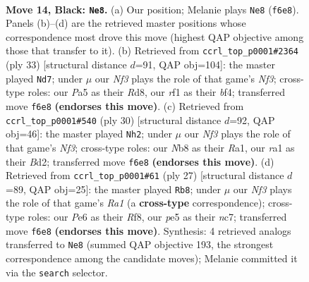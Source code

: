 \documentclass[11pt]{article}
\begin{document}
\clearpage

\begin{figure}[p]\centering
\begin{subfigure}{0.46\textwidth}\centering
\resizebox{\linewidth}{!}{%
\newchessgame
\chessboard[
  setfen={rnb2rk1/1p2bppp/1q2pn2/p3P3/P1PN1P1P/6P1/6B1/RNBQ1RK1 b - - 0 14},
  showmover=false,
  pgfstyle=straightmove, color=movearrow, markmove={f6-e8}
]}
\caption{}
\end{subfigure}\hfill
\begin{subfigure}{0.46\textwidth}\centering
\resizebox{\linewidth}{!}{%
\newchessgame
\chessboard[
  setfen={r2r2k1/pp2bppp/2p2n2/q2pP3/3Q1B2/P1N2P2/1PP3PP/3RR2K b - - 0 17},
  showmover=false,
  pgfstyle=straightmove, color=movearrow, markmove={f6-d7}
]}
\caption{}
\end{subfigure}
\\[4pt]
\begin{subfigure}{0.46\textwidth}\centering
\resizebox{\linewidth}{!}{%
\newchessgame
\chessboard[
  setfen={r2qr1k1/pp3pbp/1n1p2p1/2pP4/2P1b3/1Q3N1P/PP1BBPP1/R3R1K1 w - - 0 16},
  showmover=false,
  pgfstyle=straightmove, color=movearrow, markmove={f3-h2}
]}
\caption{}
\end{subfigure}\hfill
\begin{subfigure}{0.46\textwidth}\centering
\resizebox{\linewidth}{!}{%
\newchessgame
\chessboard[
  setfen={r1b2rk1/ppN3bp/2np4/4p2n/2P1Pp1q/3P4/PP3PBP/R1BQ1RNK b - - 1 14},
  showmover=false,
  pgfstyle=straightmove, color=movearrow, markmove={a8-b8}
]}
\caption{}
\end{subfigure}
\caption{\textbf{Move 14, Black: \texttt{Ne8}.} (a) Our position; Melanie plays \texttt{Ne8} (\texttt{f6e8}). Panels (b)--(d) are the retrieved master positions whose correspondence most drove this move (highest QAP objective among those that transfer to it). (b) Retrieved from \texttt{ccrl\_top\_p0001\#2364} (ply 33) [structural distance $d$=91, QAP obj=104]: the master played \texttt{Nd7}; under $\mu$ our \emph{Nf3} plays the role of that game's \emph{Nf3}; cross-type roles: our \emph{P}a5 as their \emph{R}d8, our \emph{r}f1 as their \emph{b}f4; transferred move \texttt{f6e8} \textbf{(endorses this move)}. (c) Retrieved from \texttt{ccrl\_top\_p0001\#540} (ply 30) [structural distance $d$=92, QAP obj=46]: the master played \texttt{Nh2}; under $\mu$ our \emph{Nf3} plays the role of that game's \emph{Nf3}; cross-type roles: our \emph{N}b8 as their \emph{R}a1, our \emph{r}a1 as their \emph{B}d2; transferred move \texttt{f6e8} \textbf{(endorses this move)}. (d) Retrieved from \texttt{ccrl\_top\_p0001\#61} (ply 27) [structural distance $d$=89, QAP obj=25]: the master played \texttt{Rb8}; under $\mu$ our \emph{Nf3} plays the role of that game's \emph{Ra1} (a \textbf{cross-type} correspondence); cross-type roles: our \emph{P}e6 as their \emph{R}f8, our \emph{p}e5 as their \emph{n}c7; transferred move \texttt{f6e8} \textbf{(endorses this move)}. Synthesis: 4 retrieved analogs transferred to \texttt{Ne8} (summed QAP objective 193, the strongest correspondence among the candidate moves); Melanie committed it via the \texttt{search} selector.}
\label{fig:thought-m27}
\end{figure}
\end{document}
